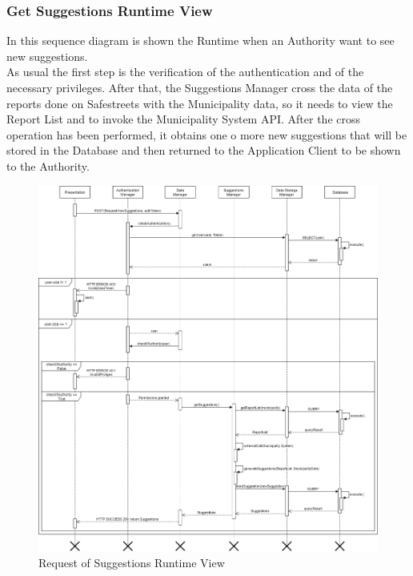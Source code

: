 \subsubsection{Get Suggestions Runtime View}
In this sequence diagram is shown the Runtime when an Authority want to see new suggestions.\\
As usual the first step is the verification of the authentication and of the necessary privileges. After that, the Suggestions Manager cross the data of the reports done on Safestreets with the Municipality data, so it needs to view the Report List and to invoke the Municipality System API. After the cross operation has been performed, it obtains one o more new suggestions that will be stored in the Database and then returned to the Application Client to be shown to the Authority.
\begin{figure}[H]
          \includegraphics[scale=0.35]{Images/Seq_viewSuggestions.png}
        \caption{Request of Suggestions Runtime View}
\end{figure}

